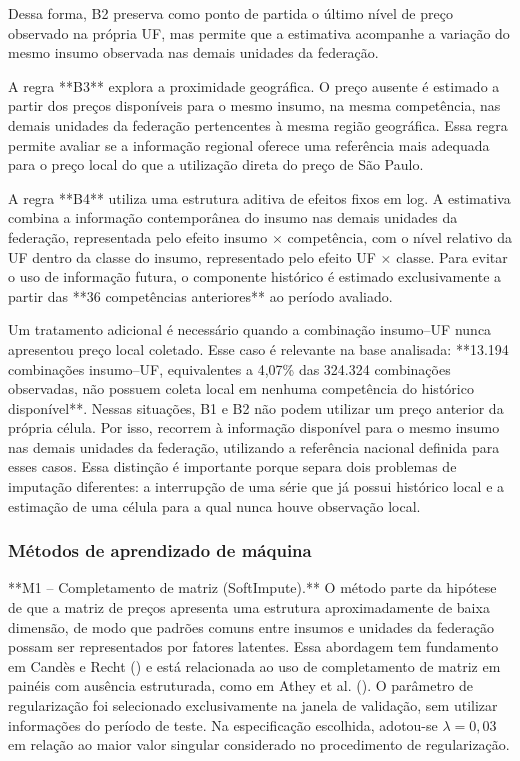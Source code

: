 Dessa forma, B2 preserva como ponto de partida o último nível de preço observado na 
própria UF, mas permite que a estimativa acompanhe a variação do mesmo insumo observada 
nas demais unidades da federação.

A regra **B3** explora a proximidade geográfica. O preço ausente é estimado a partir dos 
preços disponíveis para o mesmo insumo, na mesma competência, nas demais unidades da 
federação pertencentes à mesma região geográfica. Essa regra permite avaliar se a 
informação regional oferece uma referência mais adequada para o preço local do que a 
utilização direta do preço de São Paulo.

A regra **B4** utiliza uma estrutura aditiva de efeitos fixos em log. A estimativa 
combina a informação contemporânea do insumo nas demais unidades da federação, 
representada pelo efeito insumo \(\times\) competência, com o nível relativo da UF 
dentro da classe do insumo, representado pelo efeito UF \(\times\) classe. Para evitar 
o uso de informação futura, o componente histórico é estimado exclusivamente a partir 
das **36 competências anteriores** ao período avaliado.

Um tratamento adicional é necessário quando a combinação insumo--UF nunca apresentou 
preço local coletado. Esse caso é relevante na base analisada: **13.194 combinações 
insumo--UF, equivalentes a 4,07\% das 324.324 combinações observadas, não possuem coleta 
local em nenhuma competência do histórico disponível**. Nessas situações, B1 e B2 não 
podem utilizar um preço anterior da própria célula. Por isso, recorrem à informação 
disponível para o mesmo insumo nas demais unidades da federação, utilizando a referência 
nacional definida para esses casos. Essa distinção é importante porque separa dois 
problemas de imputação diferentes: a interrupção de uma série que já possui histórico 
local e a estimação de uma célula para a qual nunca houve observação local.

\subsubsection{Métodos de aprendizado de máquina}

**M1 – Completamento de matriz (SoftImpute).** O método parte da hipótese de que a 
matriz de preços apresenta uma estrutura aproximadamente de baixa dimensão, de modo 
que padrões comuns entre insumos e unidades da federação possam ser representados por 
fatores latentes. Essa abordagem tem fundamento em Candès e Recht () e está 
relacionada ao uso de completamento de matriz em painéis com ausência estruturada, 
como em Athey et al. (). O parâmetro de regularização foi selecionado exclusivamente 
na janela de validação, sem utilizar informações do período de teste. Na especificação 
escolhida, adotou-se \(\lambda=0,03\) em relação ao maior valor singular considerado no 
procedimento de regularização.

